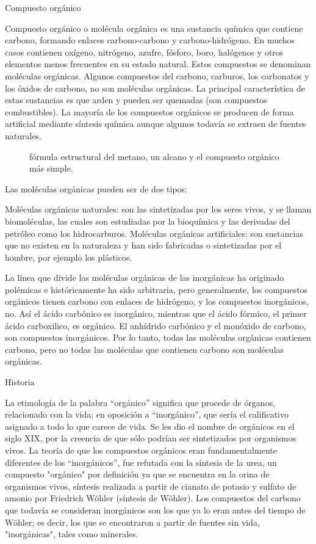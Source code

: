 \documentclass[12pt,letterpaper]{article}
\title{}
\author{Tu nombre}
\begin{document}
Compuesto orgánico

Compuesto orgánico o molécula orgánica es una sustancia química que contiene carbono, formando enlaces carbono-carbono y carbono-hidrógeno. En muchos casos contienen oxígeno, nitrógeno, azufre, fósforo, boro, halógenos y otros elementos menos frecuentes en su estado natural. Estos compuestos se denominan moléculas orgánicas. Algunos compuestos del carbono, carburos, los carbonatos y los óxidos de carbono, no son moléculas orgánicas. La principal característica de estas sustancias es que arden y pueden ser quemadas (son compuestos combustibles). La mayoría de los compuestos orgánicos se producen de forma artificial mediante síntesis química aunque algunos todavía se extraen de fuentes naturales.

\begin{figure}[h]
	\centering
	\caption{fórmula estructural del metano, un alcano y el compuesto orgánico más simple.}
\end{figure}




Las moléculas orgánicas pueden ser de dos tipos:

	Moléculas orgánicas naturales: son las sintetizadas por los seres vivos, y se llaman biomoléculas, las cuales son estudiadas por la bioquímica y las derivadas del petróleo como los hidrocarburos.
	Moléculas orgánicas artificiales: son sustancias que no existen en la naturaleza y han sido fabricadas o sintetizadas por el hombre, por ejemplo los plásticos.


La línea que divide las moléculas orgánicas de las inorgánicas ha originado polémicas e históricamente ha sido arbitraria, pero generalmente, los compuestos orgánicos tienen carbono con enlaces de hidrógeno, y los compuestos inorgánicos, no. Así el ácido carbónico es inorgánico, mientras que el ácido fórmico, el primer ácido carboxilico, es orgánico. El anhídrido carbónico y el monóxido de carbono, son compuestos inorgánicos. Por lo tanto, todas las moléculas orgánicas contienen carbono, pero no todas las moléculas que contienen carbono son moléculas orgánicas.

Historia

La etimología de la palabra ``orgánico'' significa que procede de órganos, relacionado con la vida; en oposición a ``inorgánico'', que sería el calificativo asignado a todo lo que carece de vida. Se les dio el nombre de orgánicos en el siglo XIX, por la creencia de que sólo podrían ser sintetizados por organismos vivos. La teoría de que los compuestos orgánicos eran fundamentalmente diferentes de los ``inorgánicos'', fue refutada con la síntesis de la urea, un compuesto "orgánico" por definición ya que se encuentra en la orina de organismos vivos, síntesis realizada a partir de cianato de potasio y sulfato de amonio por Friedrich Wöhler (síntesis de Wöhler). Los compuestos del carbono que todavía se consideran inorgánicos son los que ya lo eran antes del tiempo de Wöhler; es decir, los que se encontraron a partir de fuentes sin vida, "inorgánicas", tales como minerales.
\end{document}
